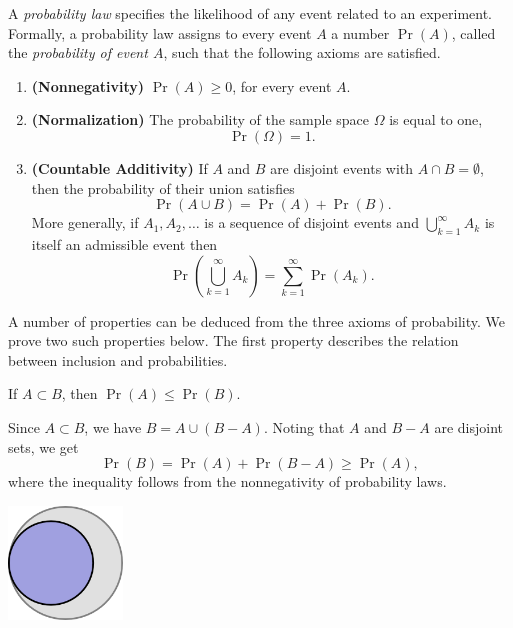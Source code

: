 A \emph{probability law} specifies the likelihood of any event related to an experiment.
Formally, a probability law assigns to every event $A$ a number $\Pr (A)$, called the \emph{probability of event $A$}, such that the following axioms are satisfied.
\begin{enumerate}
\item \textbf{(Nonnegativity)} $\Pr (A) \geq 0$, for every event $A$.
\item \textbf{(Normalization)} The probability of the sample space $\Omega$ is equal to one,
\begin{equation*}
\Pr (\Omega) = 1 .
\end{equation*}
\item \textbf{(Countable Additivity)} If $A$ and $B$ are disjoint events with $A \cap B = \emptyset$, then the probability of their union satisfies
\begin{equation*}
\Pr (A \cup B) = \Pr (A) + \Pr(B) .
\end{equation*}
More generally, if $A_1, A_2, \ldots$ is a sequence of disjoint events and $\bigcup_{k=1}^{\infty} A_k$ is itself an admissible event then
\begin{equation*}
\Pr \left( \bigcup_{k=1}^{\infty} A_k \right)
= \sum_{k = 1}^{\infty} \Pr (A_k) .
\end{equation*}
\end{enumerate}

A number of properties can be deduced from the three axioms of probability.
We prove two such properties below.
The first property describes the relation between inclusion and probabilities.
\begin{proposition}
If $A \subset B$, then $\Pr (A) \leq \Pr (B)$.
\end{proposition}
Since $A \subset B$, we have $B = A \cup (B - A)$.
Noting that $A$ and $B - A$ are disjoint sets, we get
\begin{equation*}
\Pr (B) = \Pr (A) + \Pr (B - A) \geq \Pr (A) ,
\end{equation*}
where the inequality follows from the nonnegativity of probability laws.

\begin{center}
\includegraphics[height=3.03cm]{Figures/2Chapter/subset}
\end{center}


